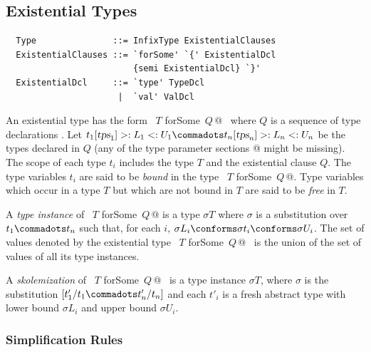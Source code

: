 \subsection{Existential Types}
\label{sec:existential-types}

\syntax\begin{lstlisting}
  Type               ::= InfixType ExistentialClauses
  ExistentialClauses ::= `forSome' `{' ExistentialDcl 
                         {semi ExistentialDcl} `}'
  ExistentialDcl     ::= `type' TypeDcl 
                      |  `val' ValDcl
\end{lstlisting}
An existential type has the form ~\lstinline@$T$ forSome {$\,Q\,$}@~
where $Q$ is a sequence of type declarations .
Let $t_1[\tps_1] >: L_1 <: U_1 \commadots t_n[\tps_n] >: L_n <: U_n$ 
be the types declared in $Q$ (any of the 
type parameter sections \lstinline@[$\tps_i$]@ might be missing).
The scope of each type $t_i$ includes the type $T$ and the existential clause $Q$. 
The type variables $t_i$ are said to be {\em bound} in the type ~\lstinline@$T$ forSome {$\,Q\,$}@.
Type variables which occur in a type $T$ but which are not bound in $T$ are said
to be {\em free} in $T$.

A {\em type instance} of ~\lstinline@$T$ forSome {$\,Q\,$}@ 
is a type $\sigma T$ where $\sigma$ is a substitution over $t_1 \commadots t_n$
such that, for each $i$, $\sigma L_i \conforms \sigma t_i \conforms \sigma U_i$.
The set of values denoted by the existential type ~\lstinline@$T$ forSome {$\,Q\,$}@~
is the union of the set of values of all its type instances.

A {\em skolemization} of ~\lstinline@$T$ forSome {$\,Q\,$}@~ is
a type instance $\sigma T$, where $\sigma$ is the substitution
$[t'_1/t_1 \commadots t'_n/t_n]$ and each $t'_i$ is a fresh abstract type
with lower bound $\sigma L_i$ and upper bound $\sigma U_i$.

\subsubsection*{Simplification Rules}\label{sec:ex-simpl}

